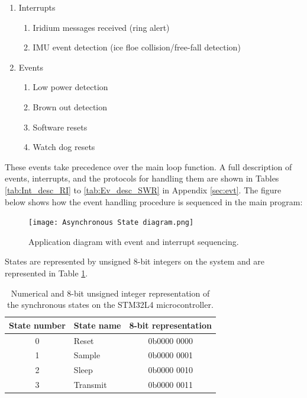 \begin{enumerate}
	\item Interrupts
	\begin{enumerate}
		\item Iridium messages received (ring alert)
		\item IMU event detection (ice floe collision/free-fall detection)
	\end{enumerate}
	\item Events
	\begin{enumerate}
		\item Low power detection
		\item Brown out detection
		\item Software resets
		\item Watch dog resets
	\end{enumerate}
\end{enumerate}

These events take precedence over the main loop function. A full description of events, interrupts, and the protocols for handling them are shown in Tables \ref{tab:Int_desc_RI} to \ref{tab:Ev_desc_SWR} in Appendix \ref{sec:evt}. The figure below shows how the event handling procedure is sequenced in the main program:

\begin{figure}[H]
	\centering
	\texttt{[image: Asynchronous State diagram.png]}
	\caption{Application diagram with event and interrupt sequencing.}
	\label{fig:main software}
\end{figure}

States are represented by unsigned 8-bit integers on the system and are represented in Table \ref{tab:state_bit}.

\begin{table}[H]
	\centering
	\caption{Numerical and 8-bit unsigned integer representation of the synchronous states on the STM32L4 microcontroller.}
	\label{tab:state_bit}
	\setlength{\textwidth}{5pt}
	\begin{tabular}{clc}
		\hline
		\textbf{State number} & \textbf{State name} & \textbf{8-bit representation}\\
		\hline
		\hline
		0 &Reset 	& 	0b0000 0000\\

		1 &Sample 	& 	0b0000 0001\\ 
	
		2 &Sleep 	& 	0b0000 0010\\
	
		3 &Transmit & 	0b0000 0011\\
		\hline
		\hline
	\end{tabular}
\end{table}

